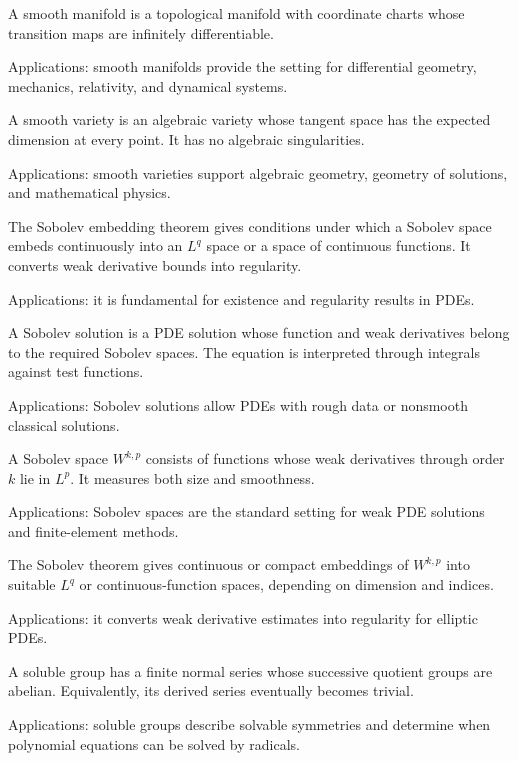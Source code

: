A smooth manifold is a topological manifold with coordinate charts whose transition maps are infinitely differentiable. \par\noindent Applications: smooth manifolds provide the setting for differential geometry, mechanics, relativity, and dynamical systems.

A smooth variety is an algebraic variety whose tangent space has the expected dimension at every point. It has no algebraic singularities. \par\noindent Applications: smooth varieties support algebraic geometry, geometry of solutions, and mathematical physics.

The Sobolev embedding theorem gives conditions under which a Sobolev space embeds continuously into an $L^q$ space or a space of continuous functions. It converts weak derivative bounds into regularity. \par\noindent Applications: it is fundamental for existence and regularity results in PDEs.

A Sobolev solution is a PDE solution whose function and weak derivatives belong to the required Sobolev spaces. The equation is interpreted through integrals against test functions. \par\noindent Applications: Sobolev solutions allow PDEs with rough data or nonsmooth classical solutions.

A Sobolev space $W^{k,p}$ consists of functions whose weak derivatives through order $k$ lie in $L^p$. It measures both size and smoothness. \par\noindent Applications: Sobolev spaces are the standard setting for weak PDE solutions and finite-element methods.

The Sobolev theorem gives continuous or compact embeddings of $W^{k,p}$ into suitable $L^q$ or continuous-function spaces, depending on dimension and indices. \par\noindent Applications: it converts weak derivative estimates into regularity for elliptic PDEs.

A soluble group has a finite normal series whose successive quotient groups are abelian. Equivalently, its derived series eventually becomes trivial. \par\noindent Applications: soluble groups describe solvable symmetries and determine when polynomial equations can be solved by radicals.

